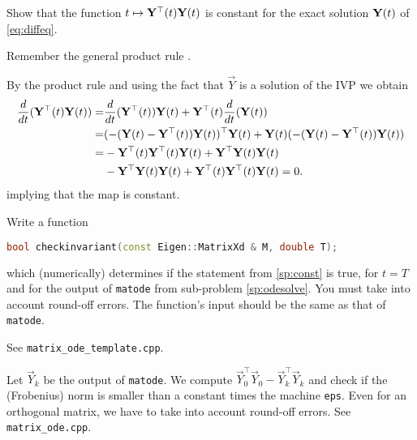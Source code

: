 \begin{problem}
\begin{subproblem}[1]
\begin{subproblem}[1]
\end{subproblem}

\begin{subproblem}[2] \label{sp:const}
Show that the function $t\mapsto {\mathbf{Y}}^{\top}(t){\mathbf{Y}}(t)$ is constant for the exact solution ${\mathbf{Y}}(t)$ of \eqref{eq:diffeq}.

\begin{hint}
  Remember the general product rule . 
\end{hint}

\begin{solution}
By the product rule and using the fact that $\vec{Y}$ is a solution of the IVP we obtain
\begin{align*}
\frac{d}{dt} ({\mathbf{Y}}^\top(t){\mathbf{Y}}(t)) = & \frac{d}{dt} ({\mathbf{Y}}^\top(t)) {\mathbf{Y}}(t) + {\mathbf{Y}}^\top(t) \frac{d}{dt}({\mathbf{Y}}(t)) \\
= & ( -({\mathbf{Y}}(t) - {\mathbf{Y}}^\top(t)) {\mathbf{Y}}(t) )^\top {\mathbf{Y}}(t) + {\mathbf{Y}}(t) ( -({\mathbf{Y}}(t) - {\mathbf{Y}}^\top(t)) {\mathbf{Y}}(t) ) \\
= & -{\mathbf{Y}}^\top(t) {\mathbf{Y}}^\top(t) {\mathbf{Y}}(t) + {\mathbf{Y}}^\top {\mathbf{Y}}(t) {\mathbf{Y}}(t) \\
& - {\mathbf{Y}}^\top {\mathbf{Y}}(t) {\mathbf{Y}}(t) + {\mathbf{Y}}^\top(t) {\mathbf{Y}}^\top(t) {\mathbf{Y}}(t) = 0.
\end{align*}
implying that the map is constant.
\end{solution}

\end{subproblem}

\begin{subproblem}[1] \label{sp:checkinvariant}
Write a \Cpp{} function 
\begin{lstlisting}[language=c++]
bool checkinvariant(const Eigen::MatrixXd & M, double T);
\end{lstlisting}
which (numerically) determines if the statement from \ref{sp:const} is true, for
$t=T$ and for the output of \verb|matode| from sub-problem \ref{sp:odesolve}. You
must take into account round-off errors. The function's input should be the same
as that of \verb|matode|.

\begin{hint}
 See \verb|matrix_ode_template.cpp|.
\end{hint}

\cprotEnv \begin{solution}
 Let $\vec{Y}_k$ be the output of \verb|matode|. We compute $\vec{Y}_0^\top \vec{Y}_0 - \vec{Y}_k^\top \vec{Y}_k$ and check if the (Frobenius) norm is smaller than a constant times the machine \verb|eps|. Even for an orthogonal matrix, we have to take into account round-off errors. See \verb|matrix_ode.cpp|.
\end{solution}


\end{subproblem}
\end{subproblem}
\end{problem}
